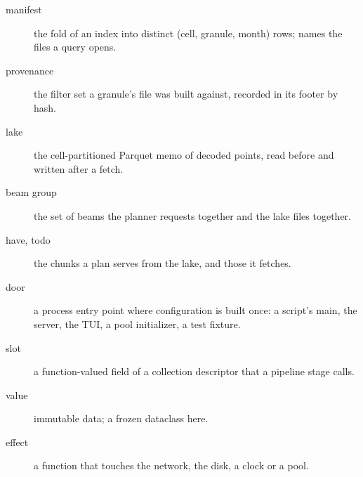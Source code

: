 \documentclass[10pt,a4paper]{article}
\begin{document}
\begin{description}
\item[manifest] the fold of an index into distinct (cell, granule, month) rows; names the files a query opens.
\item[provenance] the filter set a granule's file was built against, recorded in its footer by hash.
\item[lake] the cell-partitioned Parquet memo of decoded points, read before and written after a fetch.
\item[beam group] the set of beams the planner requests together and the lake files together.
\item[have, todo] the chunks a plan serves from the lake, and those it fetches.
\item[door] a process entry point where configuration is built once: a script's main, the server, the TUI, a
  pool initializer, a test fixture.
\item[slot] a function-valued field of a collection descriptor that a pipeline stage calls.
\item[value] immutable data; a frozen dataclass here.
\item[effect] a function that touches the network, the disk, a clock or a pool.
\end{description}

\clearpage


\end{document}
